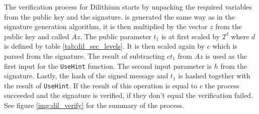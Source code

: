 The verification process for Dilithium starts by unpacking the required variables from the public key and the signature.  is generated the same way as in the signature generation algorithm, it is then multiplied by the vector $z$ from the public key and called $Az$. The public parameter $t_1$ is at first scaled by $2^d$ where $d$ is defined by table \ref{tab:dil_sec_levels}. It is then scaled again by $c$ which is parsed from the signature. The result of subtracting $ct_1$ from $Az$ is used as the first input for the \texttt{UseHint} function. The second input parameter is $h$ from the signature. Lastly, the hash of the signed message and $t_1$ is hashed together with the result of \texttt{UseHint}. If the result of this operation is equal to $c$ the process succeeded and the signature is verified, if they don't equal the verification failed. See figure \ref{img:dil_verify} for the summary of the process.

